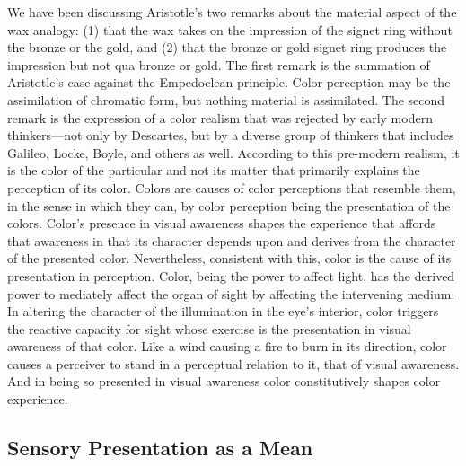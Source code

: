 We have been discussing Aristotle's two remarks about the material aspect of the wax analogy: (1) that the wax takes on the impression of the signet ring without the bronze or the gold, and (2) that the bronze or gold signet ring produces the impression but not qua bronze or gold. The first remark is the summation of Aristotle's case against the Empedoclean principle. Color perception may be the assimilation of chromatic form, but nothing material is assimilated. The second remark is the expression of a color realism that was rejected by early modern thinkers---not only by Descartes, but by a diverse group of thinkers that includes Galileo, Locke, Boyle, and others as well. According to this pre-modern realism, it is the color of the particular and not its matter that primarily explains the perception of its color. Colors are causes of color perceptions that resemble them, in the sense in which they can, by color perception being the presentation of the colors. Color's presence in visual awareness shapes the experience that affords that awareness in that its character depends upon and derives from the character of the presented color. Nevertheless, consistent with this, color is the cause of its presentation in perception. Color, being the power to affect light, has the derived power to mediately affect the organ of sight by affecting the intervening medium. In altering the character of the illumination in the eye's interior, color triggers the reactive capacity for sight whose exercise is the presentation in visual awareness of that color. Like a wind causing a fire to burn in its direction, color causes a perceiver to stand in a perceptual relation to it, that of visual awareness. And in being so presented in visual awareness color constitutively shapes color experience.



\subsection{Sensory Presentation as a Mean} %
\label{sub:sensory_presentation_as_a_mean}



